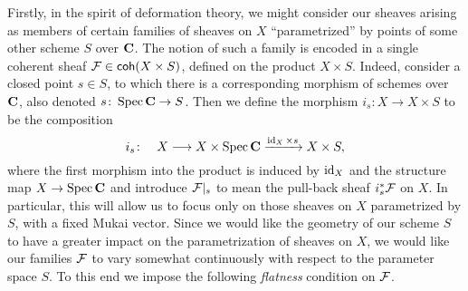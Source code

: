Firstly, in the spirit of deformation theory, we might consider our sheaves arising as members of certain families of sheaves on $X$ ``parametrized'' by points of some other scheme $S$ over $\mathbf C$. The notion of such a family is encoded in a single coherent sheaf $\mathcal F \in \mathsf{coh}(X \times S)$, defined on the product $X \times S$. Indeed, consider a closed point $s \in S$, to which there is a corresponding morphism of schemes over $\mathbf C$, also denoted $s \colon \operatorname{Spec}\mathbf C \to S$. Then we define the morphism $i_s \colon X \to X \times S$ to be the composition
\begin{equation}
    \label{eq: inclusion of X to X x S}
    i_s \colon \quad X \longrightarrow X \times \operatorname{Spec}\mathbf C \xrightarrow{\operatorname{id}_{X} \times s} X \times S,
\end{equation}
where the first morphism into the product is induced by $\operatorname{id}_{X}$ and the structure map $X \to \operatorname{Spec}\mathbf C$ and introduce $\mathcal F|_s$ to mean the pull-back sheaf $i_s^*\mathcal F$ on $X$. In particular, this will allow us to focus only on those sheaves on $X$ parametrized by $S$, with a fixed Mukai vector.
Since we would like the geometry of our scheme $S$ to have a greater impact on the parametrization of sheaves on $X$, we would like our families $\mathcal F$ to vary somewhat continuously with respect to the parameter space $S$. To this end we impose the following \emph{flatness} condition on $\mathcal F$. 






